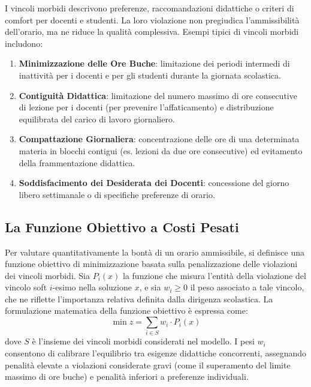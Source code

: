 I vincoli morbidi descrivono preferenze, raccomandazioni didattiche o criteri di
comfort per docenti e studenti. La loro violazione non pregiudica
l'ammissibilità dell'orario, ma ne riduce la qualità complessiva. Esempi tipici
di vincoli morbidi includono:
\begin{enumerate}
    \item \textbf{Minimizzazione delle Ore Buche}: limitazione dei periodi
    intermedi di inattività per i docenti e per gli studenti durante la giornata
    scolastica.
    \item \textbf{Contiguità Didattica}: limitazione del numero massimo di ore
    consecutive di lezione per i docenti (per prevenire l'affaticamento) e
    distribuzione equilibrata del carico di lavoro giornaliero.
    \item \textbf{Compattazione Giornaliera}: concentrazione delle ore di una
    determinata materia in blocchi contigui (es. lezioni da due ore consecutive)
    ed evitamento della frammentazione didattica.
    \item \textbf{Soddisfacimento dei Desiderata dei Docenti}: concessione del
    giorno libero settimanale o di specifiche preferenze di orario.
\end{enumerate}

\subsection*{La Funzione Obiettivo a Costi Pesati}
\label{subsec:funzione-obiettivo-teoria}

Per valutare quantitativamente la bontà di un orario ammissibile, si definisce
una funzione obiettivo di minimizzazione basata sulla penalizzazione delle
violazioni dei vincoli morbidi. Sia $P_i(x)$ la funzione che misura l'entità
della violazione del vincolo soft $i$-esimo nella soluzione $x$, e sia $w_i \ge
0$ il peso associato a tale vincolo, che ne riflette l'importanza relativa
definita dalla dirigenza scolastica. La formulazione matematica della funzione
obiettivo è espressa come:
\begin{equation}
\min z = \sum_{i \in S} w_i \cdot P_i(x)
\label{eq:funzione-costo-generale}
\end{equation}
dove $S$ è l'insieme dei vincoli morbidi considerati nel modello. I pesi $w_i$
consentono di calibrare l'equilibrio tra esigenze didattiche concorrenti,
assegnando penalità elevate a violazioni considerate gravi (come il superamento
del limite massimo di ore buche) e penalità inferiori a preferenze individuali.
